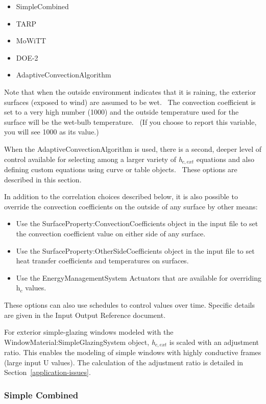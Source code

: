 \begin{itemize}
\item
  SimpleCombined
\item
  TARP
\item
  MoWiTT
\item
  DOE-2
\item
  AdaptiveConvectionAlgorithm
\end{itemize}

Note that when the outside environment indicates that it is raining, the exterior surfaces (exposed to wind) are assumed to be wet.~ The convection coefficient is set to a very high number (1000) and the outside temperature used for the surface will be the wet-bulb temperature.~ (If you choose to report this variable, you will see 1000 as its value.)

When the AdaptiveConvectionAlgorithm is used, there is a second, deeper level of control available for selecting among a larger variety of \emph{h\(_{c,ext}\)} equations and also defining custom equations using curve or table objects.~ These options are described in this section.

In addition to the correlation choices described below, it is also possible to override the convection coefficients on the outside of any surface by other means:

\begin{itemize}
\item
  Use the SurfaceProperty:ConvectionCoefficients object in the input file to set the convection coefficient value on either side of any surface.
\item
  Use the SurfaceProperty:OtherSideCoefficients object in the input file to set heat transfer coefficients and temperatures on surfaces.
\item
  Use the EnergyManagementSystem Actuators that are available for overriding h\(_{c}\) values.
\end{itemize}

These options can also use schedules to control values over time. Specific details are given in the Input Output Reference document.

For exterior simple-glazing windows modeled with the WindowMaterial:SimpleGlazingSystem
object, \emph{h\(_{c,ext}\)} is scaled with an adjustment ratio. This enables the modeling
of simple windows with highly conductive frames (large input U values). The calculation
of the adjustment ratio is detailed in Section~\ref{application-issues}.

\subsubsection{Simple Combined}\label{simple-combined}

